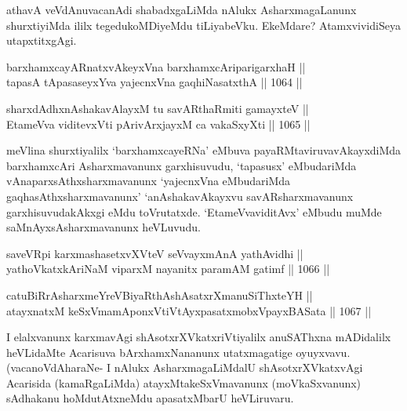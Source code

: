\begin{artha}
athavA veVdAnuvacanAdi shabadxgaLiMda nAlukx AsharxmagaLanunx shurxtiyiMda ililx tegedukoMDiyeMdu tiLiyabeVku. EkeMdare? AtamxvividiSeya utapxtitxgAgi.
\end{artha}


\begin{shl}
barxhamxcayARnatxvAkeyxVna barxhamxcAriparigarxhaH || \\
tapasA tApasaseyxYva yajecnxVna gaqhiNasatxthA ||  1064 ||  
\end{shl}
				
\begin{shl}
sharxdAdhxnAshakavAlayxM tu savARthaRmiti gamayxteV ||  \\
EtameVva viditevxVti pArivArxjayxM ca vakaSxyXti ||  1065 ||  
\end{shl}

\begin{artha}
meVlina shurxtiyalilx `barxhamxcayeRNa' eMbuva payaRMtaviruvavAkayxdiMda barxhamxcAri Asharxmavanunx garxhisuvudu, `tapasusx' eMbudariMda vAnaparxsAthxsharxmavanunx `yajecnxVna eMbudariMda gaqhasAthxsharxmavanunx' `anAshakavAkayxvu savARsharxmavanunx garxhisuvudakAkxgi eMdu toVrutatxde. `EtameVvaviditAvx' eMbudu muMde saMnAyxsAsharxmavanunx heVLuvudu.
\end{artha}


\begin{shl}
saveVR\s pi karxmashasetxvXVteV seVvayxmAnA yathAvidhi || \\
yathoVkatxkAriNaM viparxM nayanitx paramAM gatimf ||  1066 ||  
\end{shl}
				
\begin{shl}
catuBiRrAsharxmeYreVBiyaRthAshAsatxrXmanuSiThxteYH || \\
atayxnatxM keSxVmamAponxVtiVtAyxpasatxmobxV\s payxBASata ||  1067 ||  
\end{shl}

\begin{artha}
I elalxvanunx karxmavAgi shAsotxrXVkatxriVtiyalilx anuSAThxna mADidalilx heVLidaMte Acarisuva bArxhamxNananunx utatxmagatige oyuyxvavu. (vacanoVdAharaNe- I nAlukx AsharxmagaLiMdalU shAsotxrXVkatxvAgi Acarisida (kamaRgaLiMda) atayxMtakeSxVmavanunx (moVkaSxvanunx) sAdhakanu hoMdutAtxneMdu apasatxMbarU heVLiruvaru.
\end{artha}

